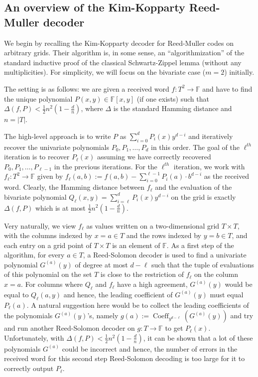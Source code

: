 \documentclass{article}
\def\Field{\mathbb{F}}
\let\F\Field
\newcommand{\coeff}{\operatorname{Coeff}}
\begin{document}
	\subsection{An overview of the Kim-Kopparty Reed-Muller decoder}
	
	We begin by recalling the Kim-Kopparty decoder for Reed-Muller codes
	on arbitrary grids. Their algorithm is, in some sense, an
	``algorithmization'' of the standard inductive proof of the classical
	Schwartz-Zippel lemma (without any multiplicities). For simplicity, we
	will focus on the bivariate case ($m=2$) initially.
	
	The setting is as follows: we are given a received word
	$f\colon T^2 \to \mathbb{F}$ and have to find the unique polynomial
	$P(x, y) \in \mathbb{F}[x, y]$ (if one exists) such that
	$\Delta(f,P) < \frac{1}{2} n^2 (1-\frac{d}{n})$, where $\Delta$ is
	the standard Hamming distance and $n=|T|$.
	
	The high-level approach is to write $P$ as
	$\sum_{i=0}^d P_i(x) y^{d-i}$ and iteratively recover the univariate
	polynomials $P_0, P_1, \ldots, P_d$ in this order. The goal of the
	$\ell^{th}$ iteration is to recover $P_\ell(x)$ assuming we have
	correctly recovered $P_0, P_1,\ldots, P_{\ell-1}$ in the previous
	iterations. For the $\ell^{th}$ iteration, we work with $f_{\ell}\colon T^2 \to \F$
	given by
	$f_{\ell}(a,b) := f(a,b) - \sum_{i = 0}^{\ell-1}P_i(a)\cdot b^{d-i}$ as
	the received word. Clearly, the Hamming distance between $f_{\ell}$
	and the evaluation of the bivariate polynomial
	$Q_{\ell}(x,y) = \sum_{i = \ell}^d P_i(x)y^{d-i}$ on the grid is exactly
	$\Delta(f,P)$ which is at most $\frac{1}{2} n^2 (1-\frac{d}{n})$.  
	
	
	Very naturally, we view $f_{\ell}$ as values written on a two-dimensional grid
	$T \times T$, with the columns indexed by $x = a \in T$ and the rows
	indexed by $y = b \in T$, and each entry on a grid point of
	$T \times T$ is an element of $\F$. As a first step of the algorithm,
	for every $a \in T$, a Reed-Solomon decoder is used to find a
	univariate polynomial $G^{(a)}(y)$ of degree at most $d - \ell$ such that the tuple
	of evaluations of this polynomial on the set $T$ is close to the
	restriction of $f_{\ell}$ on the column $x = a$. For columns where $Q_{\ell}$ and $f_{\ell}$
	have a high agreement, $G^{(a)}(y)$ would be equal to $Q_{\ell}(a, y)$ and
	hence, the leading coefficient of $G^{(a)}(y)$ must equal
	$P_{\ell}(a)$. A natural suggestion here would be to collect the
	leading coefficients of the polynomials $G^{(a)}(y)$'s, namely $g(a) := \coeff_{y^{d-\ell}}(G^{(a)}(y))$  and try and run another
	Reed-Solomon decoder on $g\colon T\to \F$ to get $P_{\ell}(x)$. Unfortunately, with
	$\Delta(f,P) < \frac{1}{2} n^2 (1-\frac{d}{n})$, it can be shown that
	a lot of these polynomials $G^{(a)}$ could be incorrect and hence, the
	number of errors in the received word for this second step
	Reed-Solomon decoding is too large for it to correctly output
	$P_{\ell}$.
	
\end{document}
